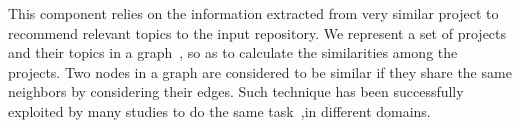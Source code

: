 This component relies on the information extracted from very similar project to recommend relevant topics to the input repository. We represent a set of projects and their topics in a graph~\cite{Nguyen:2019:FRS:3339505.3339636}, so as to calculate the similarities among the projects. Two nodes in a graph are considered to be similar if they share the same neighbors by considering their edges. Such technique has been successfully exploited by many studies to do the same task~\cite{BRIGUEZ20146467},\cite{DiNoia:2012:LOD:2362499.2362501}in different domains.


